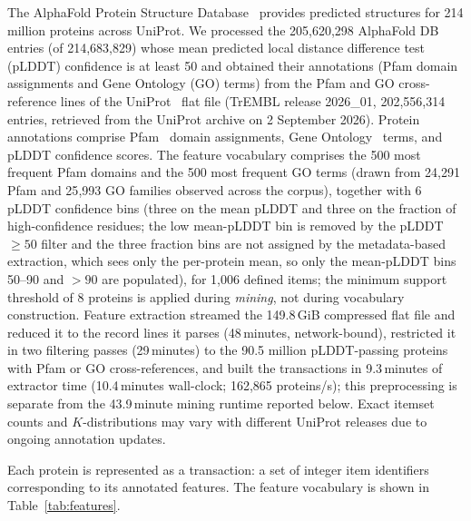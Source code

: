 \documentclass[10pt,a4paper,twocolumn]{article}
\begin{document}
The AlphaFold Protein Structure Database~\cite{varadi2024} provides predicted structures for 214 million proteins across UniProt. We processed the 205,620,298 AlphaFold DB entries (of 214,683,829) whose mean predicted local distance difference test (pLDDT) confidence is at least 50 and obtained their annotations (Pfam domain assignments and Gene Ontology (GO) terms) from the Pfam and GO cross-reference lines of the UniProt~\cite{uniprot2023} flat file (TrEMBL release 2026\_01, 202,556,314 entries, retrieved from the UniProt archive on 2 September 2026). Protein annotations comprise Pfam~\cite{mistry2021} domain assignments, Gene Ontology~\cite{go2023} terms, and pLDDT confidence scores. The feature vocabulary comprises the 500 most frequent Pfam domains and the 500 most frequent GO terms (drawn from 24{,}291 Pfam and 25{,}993 GO families observed across the corpus), together with 6 pLDDT confidence bins (three on the mean pLDDT and three on the fraction of high-confidence residues; the low mean-pLDDT bin is removed by the pLDDT${\geq}50$ filter and the three fraction bins are not assigned by the metadata-based extraction, which sees only the per-protein mean, so only the mean-pLDDT bins 50--90 and ${>}90$ are populated), for 1{,}006 defined items; the minimum support threshold of 8 proteins is applied during \emph{mining}, not during vocabulary construction. Feature extraction streamed the 149.8\,GiB compressed flat file and reduced it to the record lines it parses (48\,minutes, network-bound), restricted it in two filtering passes (29\,minutes) to the 90.5 million pLDDT-passing proteins with Pfam or GO cross-references, and built the transactions in 9.3\,minutes of extractor time (10.4\,minutes wall-clock; 162,865 proteins/s); this preprocessing is separate from the 43.9\,minute mining runtime reported below. Exact itemset counts and $K$-distributions may vary with different UniProt releases due to ongoing annotation updates.

Each protein is represented as a transaction: a set of integer item identifiers corresponding to its annotated features. The feature vocabulary is shown in Table~\ref{tab:features}.

\begin{table}[h]
\caption{Feature vocabulary composition: 1,006 items are defined (6 pLDDT confidence bins, 500 Pfam domains, 500 GO terms) and 1,002 pass the support threshold of 8 proteins (all 1,000 Pfam/GO items plus 2 pLDDT bins; the other 4 pLDDT bins are empty).}
\label{tab:features}
\centering
{}
\end{table}
\end{document}
